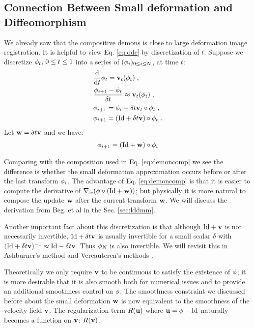 \documentclass[letterpaper,12pt]{article}
\begin{document}
\subsection{Connection Between Small deformation and Diffeomorphism}

We already saw that the compositive demons is close to large deformation image registration. It is helpful to view Eq. \ref{eq:ode} by discretization of $t$. Suppose we discretize $\phi_t, \, 0\leq t \leq 1$ into a series of $(\phi_i)_{0 \leq i \leq N}$, at time $t$:
\begin{equation}
\begin{split}
& \frac{\text{d}}{\text{d} t} \phi_t = \mathbf{v}_t(\phi_t) \; , \\
& \frac{\phi_{i+1}-\phi_{t}}{\delta t} \approx \mathbf{v}_t(\phi_t) \; , \\
& \phi_{i+1} = \phi_{i} + \delta t \mathbf{v}_t \circ \phi_t \; , \\
& \phi_{i+1} = (\text{Id} + \delta t \mathbf{v}) \circ \phi_t \; .\\
\end{split}
\label{eq:discretizeode}
\end{equation}
Let $\mathbf{w} = \delta t \mathbf{v}$ and we have:
\begin{align}
\phi_{i+1} = (\text{Id} + \mathbf{w}) \circ \phi_i
\end{align}

Comparing with the composition used in Eq. \ref{eq:demoncomp} we see
the difference is whether the small deformation approximation occurs before or after the last transform $\phi_i$. The advantage of Eq. \ref{eq:demoncomp} is that it is easier to compute the derivative of $\nabla_w(\phi \circ (\text{Id} + \mathbf{w})) $; but physically it is more natural to compose the update $\mathbf{w}$ after the current transform $\mathbf{w}$. We will discuss the derivation from Beg. et al \cite{Beg2005Computing} in the Sec. \ref{sec:lddmm}.

Another important fact about this discretization is that although $\text{Id} + \mathbf{v}$ is not necessarily invertible, $\text{Id} + \delta t \mathbf{v}$ is usually invertible for a small scalar $\delta$ with $(\text{Id} + \delta t \mathbf{v})^{-1} \approx \text{Id} - \delta t \mathbf{v}$. Thus $\phi_N$ is also invertible. We will revisit this in Ashburner's method \cite{Ashburner2007} and Vercauteren's methods \cite{Vercauteren2009, Vercauteren2008Symmetric}.
 
Theoretically we only require $\mathbf{v}$ to be continuous to satisfy the
existence of $\phi$; it is more desirable that it is also smooth
both for numerical issues and to provide an additional smoothness
control on $\phi$. The smoothness constraint we discussed before about the small deformation $\mathbf{w}$ is now equivalent to the smoothness of the velocity field $\mathbf{v}$. The regularization term $R(\mathbf{u})$ where $\mathbf{u} = \phi - \text{Id}$ naturally becomes a function on $\mathbf{v}$: $R(\mathbf{v})$.
\end{document}
